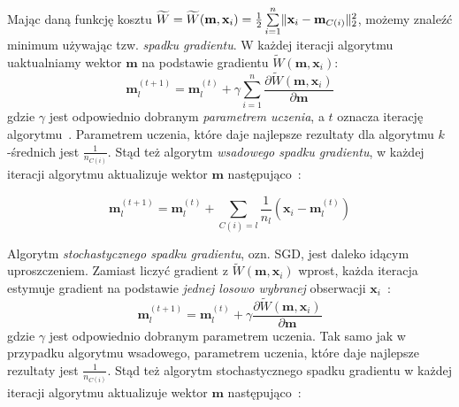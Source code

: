 \documentclass{praca1}
\DeclarePairedDelimiter{\norm}{\lVert}{\rVert}
\begin{document}

Mając daną funkcję kosztu $\widetilde{W} = \widetilde{W}(\mathbf{m}, \mathbf{x}_i) = \frac{1}{2}\sum\limits_{i=1}^{n} \norm{\mathbf{x}_i - \mathbf{m}_{C(i)}}_2^2 $, możemy znaleźć minimum używając tzw. \emph{spadku gradientu}. W każdej iteracji algorytmu uaktualniamy wektor $\mathbf{m}$ na podstawie gradientu $\widetilde{W}(\mathbf{m}, \mathbf{x}_i)$:
\begin{equation}
\mathbf{m}^{(t+1)}_l = \mathbf{m}_l^{(t)} + \gamma \sum\limits_{i=1}^{n} \frac{\partial \widetilde{W}(\mathbf{m}, \mathbf{x}_i)}{\partial \mathbf{m}}
\end{equation}
gdzie $\gamma$ jest odpowiednio dobranym \emph{parametrem uczenia}, a $t$ oznacza iterację algorytmu~\cite{Bottou2012:sgdtricks}. Parametrem uczenia, które daje najlepsze rezultaty dla algorytmu $k$-średnich jest $\frac{1}{n_{C(i)}}$. Stąd też algorytm \emph{wsadowego spadku gradientu}, w każdej iteracji algorytmu aktualizuje wektor $\mathbf{m}$ następująco~\cite{Bottou1995:convergenceproperties}:



\begin{equation}
\mathbf{m}_l^{(t+1)} = \mathbf{m}_l^{(t)} + \sum\limits_{C(i) = l}   \frac{1}{n_l}(\mathbf{x}_i - \mathbf{m}^{(t)}_l) %
\end{equation}

Algorytm \emph{stochastycznego spadku gradientu}, ozn. SGD, jest daleko idącym uproszczeniem. Zamiast liczyć gradient z $\widetilde{W}(\mathbf{m}, \mathbf{x}_i)$ wprost, każda iteracja estymuje gradient na podstawie \emph{jednej losowo wybranej} obserwacji $\mathbf{x}_i$~\cite{Bottou2012:sgdtricks}:
\begin{equation}
\mathbf{m}_l^{(t+1)} = \mathbf{m}_l^{(t)} + \gamma \frac{\partial \widetilde{W}(\mathbf{m}, \mathbf{x}_i)}{\partial \mathbf{m}}
\end{equation}
gdzie $\gamma$ jest odpowiednio dobranym parametrem uczenia. Tak samo jak w przypadku algorytmu wsadowego, parametrem uczenia, które daje najlepsze rezultaty jest $\frac{1}{n_{C(i)}}$. Stąd też algorytm stochastycznego spadku gradientu w każdej iteracji algorytmu aktualizuje wektor $\mathbf{m}$ następująco~\cite{Bottou1995:convergenceproperties}:
\end{document}
